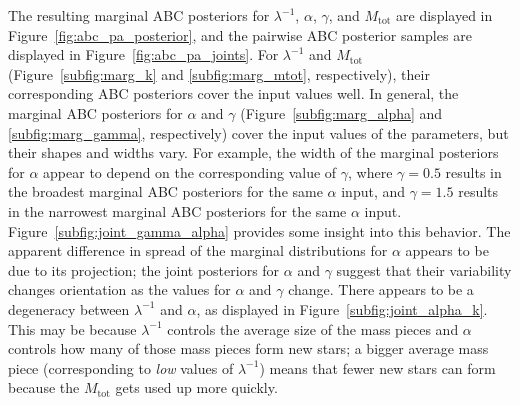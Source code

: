 \documentclass[ejs]{imsart}
\numberwithin{equation}{section}
\theoremstyle{plain}
\newcommand{\Mtot}{M_{\text{tot}}}
\begin{document}
The resulting marginal ABC posteriors for $\lambda^{-1}$, $\alpha$, $\gamma$, and $\Mtot$ are displayed in Figure~\ref{fig:abc_pa_posterior}, and the pairwise ABC posterior samples are displayed in Figure~\ref{fig:abc_pa_joints}.  
%
For $\lambda^{-1}$ and $\Mtot$ (Figure~\ref{subfig:marg_k} and \ref{subfig:marg_mtot}, respectively), their corresponding ABC posteriors cover the input values well.   
%
In general, the marginal ABC posteriors for $\alpha$ and $\gamma$ (Figure~\ref{subfig:marg_alpha} and \ref{subfig:marg_gamma}, respectively) cover the input values of the parameters, but their shapes and widths vary.  
%
For example, the width of the marginal posteriors for $\alpha$ appear to depend on the corresponding value of $\gamma$, where $\gamma = 0.5$ results in the broadest marginal ABC posteriors for the same $\alpha$ input, and $\gamma = 1.5$ results in the narrowest marginal ABC posteriors for the same $\alpha$ input. 
Figure~\ref{subfig:joint_gamma_alpha} provides some insight into this behavior.  
%
The apparent difference in spread of the marginal distributions for $\alpha$ appears to be due to its projection; the joint posteriors for $\alpha$ and $\gamma$ suggest that their variability changes orientation as the values for $\alpha$ and $\gamma$ change.
%
There appears to be a degeneracy between  $\lambda^{-1}$ and $\alpha$, as displayed in Figure~\ref{subfig:joint_alpha_k}.  This may be because $\lambda^{-1}$ controls the average size of the mass pieces and $\alpha$ controls how many of those mass pieces form new stars; a bigger average mass piece (corresponding to \emph{low} values of $\lambda^{-1}$) means that fewer new stars can form because the $\Mtot$ gets used up more quickly.
%
\end{document}
